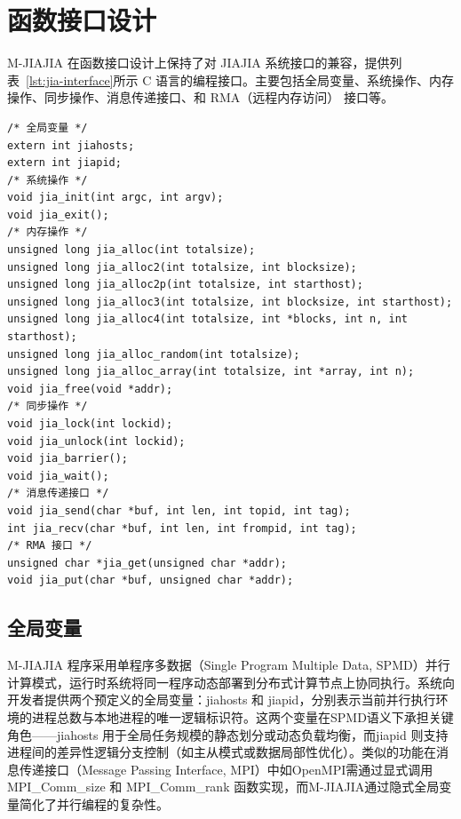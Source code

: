 {\section{函数接口设计}
M-JIAJIA 在函数接口设计上保持了对 JIAJIA 系统接口的兼容，提供列表~\ref{lst:jia-interface}所示 C 语言的编程接口。主要包括全局变量、系统操作、内存操作、同步操作、消息传递接口、和 RMA（远程内存访问） 接口等。
\begin{lstlisting}[style=CStyle, caption={M-JIAJIA C 接口总览}, label={lst:jia-interface}]
/* 全局变量 */
extern int jiahosts;
extern int jiapid;
/* 系统操作 */
void jia_init(int argc, int argv);
void jia_exit();
/* 内存操作 */
unsigned long jia_alloc(int totalsize);
unsigned long jia_alloc2(int totalsize, int blocksize);
unsigned long jia_alloc2p(int totalsize, int starthost);
unsigned long jia_alloc3(int totalsize, int blocksize, int starthost);
unsigned long jia_alloc4(int totalsize, int *blocks, int n, int starthost);
unsigned long jia_alloc_random(int totalsize);
unsigned long jia_alloc_array(int totalsize, int *array, int n);
void jia_free(void *addr);
/* 同步操作 */
void jia_lock(int lockid);
void jia_unlock(int lockid);
void jia_barrier();
void jia_wait();
/* 消息传递接口 */
void jia_send(char *buf, int len, int topid, int tag);
int jia_recv(char *buf, int len, int frompid, int tag);
/* RMA 接口 */
unsigned char *jia_get(unsigned char *addr);
void jia_put(char *buf, unsigned char *addr);
\end{lstlisting}

\subsection{全局变量}
M-JIAJIA 程序采用单程序多数据（Single Program Multiple Data, SPMD）并行计算模式，运行时系统将同一程序动态部署到分布式计算节点上协同执行。系统向开发者提供两个预定义的全局变量：jiahosts 和 jiapid，分别表示当前并行执行环境的进程总数与本地进程的唯一逻辑标识符。这两个变量在SPMD语义下承担关键角色——jiahosts 用于全局任务规模的静态划分或动态负载均衡，而jiapid 则支持进程间的差异性逻辑分支控制（如主从模式或数据局部性优化）。类似的功能在消息传递接口（Message Passing Interface, MPI）中如OpenMPI需通过显式调用 MPI\_Comm\_size 和 MPI\_Comm\_rank 函数实现，而M-JIAJIA通过隐式全局变量简化了并行编程的复杂性。
}

